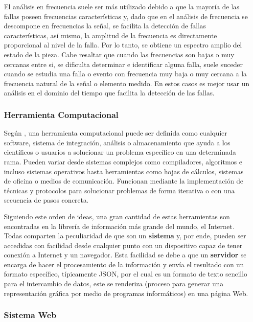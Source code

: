 El análisis en frecuencia suele ser más utilizado debido a que
la mayoría de las fallas poseen frecuencias características y, dado que en  el
análisis de frecuencia se descompone en frecuencias la señal, se facilita la
detección de fallas características, así mismo, la amplitud de la frecuencia es
directamente proporcional al nivel de la falla. Por lo tanto, se obtiene un
espectro amplio del estado de la pieza.
Cabe resaltar que cuando las frecuencias son bajas o muy cercanas entre si,
se dificulta determinar e identificar alguna falla, suele suceder cuando se
estudia una falla o evento con frecuencia muy baja o muy cercana a la frecuencia
natural de la señal o elemento medido. En estos casos es mejor
usar un análisis en el dominio del tiempo que  facilita la
detección de las fallas.



\subsubsection{Herramienta Computacional}


Según \textcite{Herramienta}, una herramienta computacional puede ser definida  como
cualquier software,
sistema de integración, análisis o almacenamiento que  ayuda a los científicos
o usuarios a solucionar un problema específico en una determinada rama. Pueden
variar desde sistemas complejos como compiladores, algoritmos
e incluso sistemas operativos hasta herramientas como hojas de cálculos, sistemas
de oficina o medios de comunicación. Funcionan mediante la implementación de
técnicas y protocolos para solucionar problemas de forma iterativa o con una
secuencia de pasos concreta.

Siguiendo este orden de ideas, una gran cantidad de estas herramientas son
encontradas en la librería de información más grande del mundo, el Internet.
Todas comparten la peculiaridad de que son un \textbf{sistema} y,  por ende, pueden
ser accedidas con facilidad desde cualquier punto con un dispositivo capaz de
tener conexión a Internet y un navegador. Esta facilidad se debe a que un
\textbf{servidor} se encarga de hacer el procesamiento de la información y envía
el resultado con un formato específico, típicamente  JSON, por  el cual es un formato de texto sencillo para el intercambio de
datos, este se renderiza (proceso para generar una representación gráfica por
medio de programas informáticos) en una página Web.

\subsubsection{Sistema Web}


